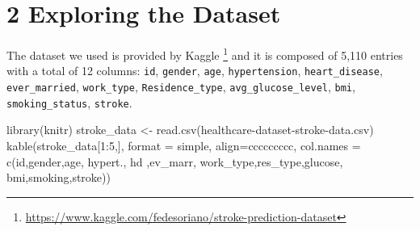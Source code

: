 \documentclass[
]{article}
\newenvironment{Shaded}{\begin{snugshade}}{\end{snugshade}}
\newcommand{\AttributeTok}[1]{\textcolor[rgb]{0.77,0.63,0.00}{#1}}
\newcommand{\DecValTok}[1]{\textcolor[rgb]{0.00,0.00,0.81}{#1}}
\newcommand{\FunctionTok}[1]{\textcolor[rgb]{0.00,0.00,0.00}{#1}}
\newcommand{\NormalTok}[1]{#1}
\newcommand{\OtherTok}[1]{\textcolor[rgb]{0.56,0.35,0.01}{#1}}
\newcommand{\SpecialCharTok}[1]{\textcolor[rgb]{0.00,0.00,0.00}{#1}}
\newcommand{\StringTok}[1]{\textcolor[rgb]{0.31,0.60,0.02}{#1}}
\begin{document}
\hypertarget{exploring-the-dataset}{%
\section{2 Exploring the Dataset}\label{exploring-the-dataset}}

The dataset we used is provided by Kaggle \footnote{\url{https://www.kaggle.com/fedesoriano/stroke-prediction-dataset}}
and it is composed of 5,110 entries with a total of 12 columns:
\texttt{id}, \texttt{gender}, \texttt{age}, \texttt{hypertension},
\texttt{heart\_disease}, \texttt{ever\_married}, \texttt{work\_type},
\texttt{Residence\_type}, \texttt{avg\_glucose\_level}, \texttt{bmi},
\texttt{smoking\_status}, \texttt{stroke}.

\begin{Shaded}
\begin{Highlighting}[]
\FunctionTok{library}\NormalTok{(knitr)}
\NormalTok{stroke\_data }\OtherTok{\textless{}{-}} \FunctionTok{read.csv}\NormalTok{(}\StringTok{\textquotesingle{}healthcare{-}dataset{-}stroke{-}data.csv\textquotesingle{}}\NormalTok{)}
\FunctionTok{kable}\NormalTok{(stroke\_data[}\DecValTok{1}\SpecialCharTok{:}\DecValTok{5}\NormalTok{,], }\AttributeTok{format =} \StringTok{\textquotesingle{}simple\textquotesingle{}}\NormalTok{, }\AttributeTok{align=}\StringTok{\textquotesingle{}ccccccccc\textquotesingle{}}\NormalTok{, }
      \AttributeTok{col.names =} \FunctionTok{c}\NormalTok{(}\StringTok{\textquotesingle{}id\textquotesingle{}}\NormalTok{,}\StringTok{\textquotesingle{}gender\textquotesingle{}}\NormalTok{,}\StringTok{\textquotesingle{}age\textquotesingle{}}\NormalTok{, }\StringTok{\textquotesingle{}hypert.\textquotesingle{}}\NormalTok{, }\StringTok{\textquotesingle{}hd\textquotesingle{}}\NormalTok{ ,}\StringTok{\textquotesingle{}ev\_marr\textquotesingle{}}\NormalTok{,}
                    \StringTok{\textquotesingle{}work\_type\textquotesingle{}}\NormalTok{,}\StringTok{\textquotesingle{}res\_type\textquotesingle{}}\NormalTok{,}\StringTok{\textquotesingle{}glucose\textquotesingle{}}\NormalTok{, }\StringTok{\textquotesingle{}bmi\textquotesingle{}}\NormalTok{,}\StringTok{\textquotesingle{}smoking\textquotesingle{}}\NormalTok{,}\StringTok{\textquotesingle{}stroke\textquotesingle{}}\NormalTok{))}
\end{Highlighting}
\end{Shaded}
\newpage
\setlength\LTleft{-1cm}
\end{document}
